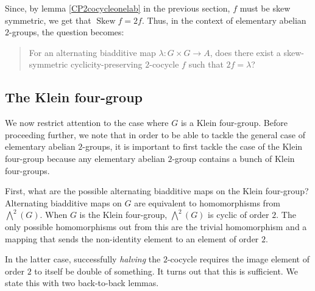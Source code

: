 \documentclass[10pt]{amsart}
\newcommand{\Skew}{\operatorname{Skew}}
\begin{document}
Since, by lemma \ref{CP2cocycleonelab} in the previous section, $f$
must be skew symmetric, we get that $\Skew f = 2f$. Thus, in the
context of elementary abelian $2$-groups, the question becomes:

\begin{quote}
  For an alternating biadditive map $\lambda:G \times G \to A$, does
  there exist a skew-symmetric cyclicity-preserving $2$-cocycle $f$
  such that $2f = \lambda$?
\end{quote}

\subsection{The Klein four-group}

We now restrict attention to the case where $G$ is a Klein
four-group. Before proceeding further, we note that in order to be
able to tackle the general case of elementary abelian $2$-groups, it
is important to first tackle the case of the Klein four-group because
any elementary abelian $2$-group contains a bunch of Klein
four-groups.

First, what are the possible alternating biadditive maps on the Klein
four-group? Alternating biadditive maps on $G$ are equivalent to
homomorphisms from $\bigwedge^2(G)$. When $G$ is the Klein four-group,
$\bigwedge^2(G)$ is cyclic of order $2$. The only possible
homomorphisms out from this are the trivial homomorphism and a mapping
that sends the non-identity element to an element of order $2$.

In the latter case, successfully {\em halving} the $2$-cocycle
requires the image element of order $2$ to itself be double of
something. It turns out that this is sufficient. We state this with
two back-to-back lemmas.
\end{document}
